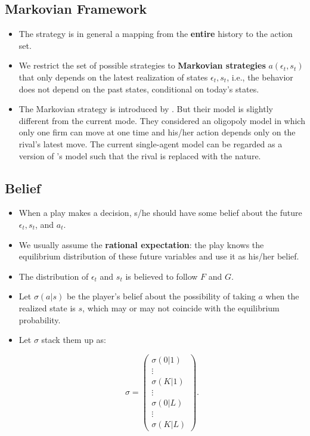 \documentclass[]{book}
\providecommand{\tightlist}{%
  \setlength{\itemsep}{0pt}\setlength{\parskip}{0pt}}
\begin{document}
\subsection{Markovian Framework}\label{markovian-framework}

\begin{itemize}
\tightlist
\item
  The strategy is in general a mapping from the \textbf{entire} history
  to the action set.
\item
  We restrict the set of possible strategies to \textbf{Markovian
  strategies} \(a(\epsilon_t, s_t)\) that only depends on the latest
  realization of states \(\epsilon_t, s_t\), i.e., the behavior does not
  depend on the past states, conditional on today's states.
\item
  The Markovian strategy is introduced by
  \citet{maskinTheoryDynamicOligopoly1988}. But their model is slightly
  different from the current mode. They considered an oligopoly model in
  which only one firm can move at one time and his/her action depends
  only on the rival's latest move. The current single-agent model can be
  regarded as a version of \citet{maskinTheoryDynamicOligopoly1988}'s
  model such that the rival is replaced with the nature.
\end{itemize}

\subsection{Belief}\label{belief}

\begin{itemize}
\tightlist
\item
  When a play makes a decision, s/he should have some belief about the
  future \(\epsilon_t, s_t\), and \(a_t\).
\item
  We usually assume the \textbf{rational expectation}: the play knows
  the equilibrium distribution of these future variables and use it as
  his/her belief.
\item
  The distribution of \(\epsilon_t\) and \(s_t\) is believed to follow
  \(F\) and \(G\).
\item
  Let \(\sigma(a|s)\) be the player's belief about the possibility of
  taking \(a\) when the realized state is \(s\), which may or may not
  coincide with the equilibrium probability.
\item
  Let \(\sigma\) stack them up as:

  \begin{equation}
  \sigma = 
  \begin{pmatrix}
  \sigma(0|1)\\
  \vdots\\
  \sigma(K|1)\\
  \vdots\\ 
  \sigma(0|L)\\
  \vdots\\ 
  \sigma(K|L)
  \end{pmatrix}.
  \end{equation}
\end{itemize}
\end{document}
